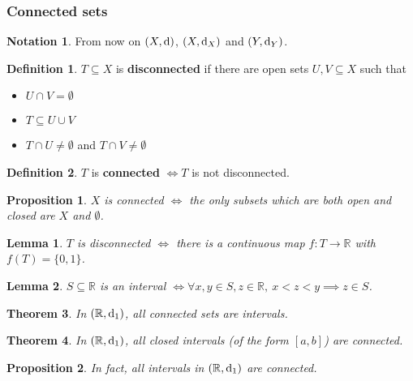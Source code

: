 \documentclass[12pt]{article}
\newtheorem{thm}{Theorem}[section]
\newtheorem{lem}[thm]{Lemma}
\newtheorem*{prop*}{Proposition}
\theoremstyle{definition}
\newtheorem{defn}{Definition}[section]
\newtheorem*{not*}{Notation}
\renewcommand{\d}{{\textnormal{d}}}
\begin{document}
\subsubsection{Connected sets}

\begin{not*}
	From now on $(X, \d)$, $(X, \d_X)$ and $(Y, \d_Y)$.
\end{not*}

\begin{defn}
	$T \subseteq X$ is \textbf{disconnected} if there are open sets $U, V \subseteq X$ such that
	\begin{itemize}
		\item $U \cap V = \emptyset$
		\item $T \subseteq U \cup V$
		\item $T \cap U \neq \emptyset$ and $T \cap V \neq \emptyset$
	\end{itemize}
\end{defn}

\begin{defn}
	$T$ is \textbf{connected} $\iff T$ is not disconnected.
\end{defn}

\begin{prop*}
	$X$ is connected $\iff$ the only subsets which are both open and closed are $X$ and $\emptyset$.
\end{prop*}

\begin{lem}
	$T$ is disconnected $\iff$ there is a continuous map $f : T \to \mathbb{R}$ with $f(T) = \{0, 1\}$.
\end{lem}

\begin{lem}
	$S \subseteq \mathbb{R}$ is an interval $\iff \forall x, y \in S, z \in \mathbb{R},\ x < z < y \implies z \in S$.
\end{lem}

\begin{thm}
	In $(\mathbb{R}, \d_1)$, all connected sets are intervals.
\end{thm}

\begin{thm}
	In $(\mathbb{R}, \d_1)$, all closed intervals (of the form $[a, b]$) are connected.
\end{thm}

\begin{prop*}
	In fact, all intervals in $(\mathbb{R}, \d_1)$ are connected.
\end{prop*}
\end{document}
